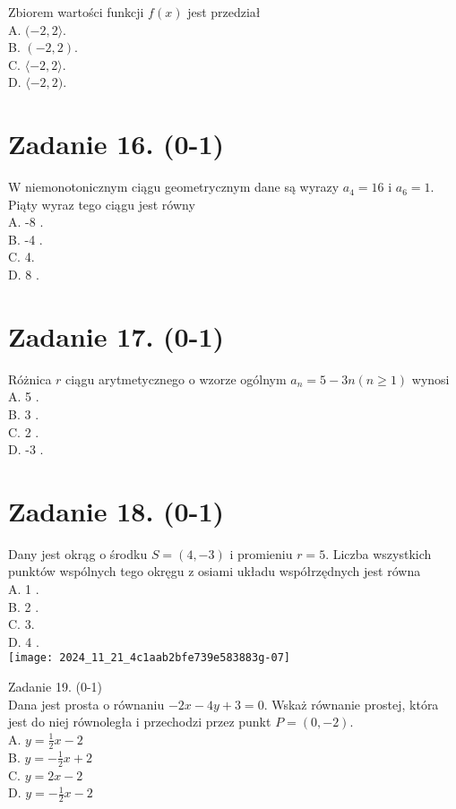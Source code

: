 \documentclass[10pt]{article}
\begin{document}
Zbiorem wartości funkcji \(f(x)\) jest przedział\\
A. \((-2,2\rangle\).\\
B. \((-2,2)\).\\
C. \(\langle-2,2\rangle\).\\
D. \(\langle-2,2)\).

\section*{Zadanie 16. (0-1)}
W niemonotonicznym ciągu geometrycznym dane są wyrazy \(a_{4}=16\) i \(a_{6}=1\). Piąty wyraz tego ciągu jest równy\\
A. -8 .\\
B. -4 .\\
C. 4.\\
D. 8 .

\section*{Zadanie 17. (0-1)}
Różnica \(r\) ciągu arytmetycznego o wzorze ogólnym \(a_{n}=5-3 n(n \geqslant 1)\) wynosi\\
A. 5 .\\
B. 3 .\\
C. 2 .\\
D. -3 .

\section*{Zadanie 18. (0-1)}
Dany jest okrąg o środku \(S=(4,-3)\) i promieniu \(r=5\). Liczba wszystkich punktów wspólnych tego okręgu z osiami układu współrzędnych jest równa\\
A. 1 .\\
B. 2 .\\
C. 3.\\
D. 4 .\\
\texttt{[image: 2024\_11\_21\_4c1aab2bfe739e583883g-07]}

Zadanie 19. (0-1)\\
Dana jest prosta o równaniu \(-2 x-4 y+3=0\). Wskaż równanie prostej, która jest do niej równoległa i przechodzi przez punkt \(P=(0,-2)\).\\
A. \(y=\frac{1}{2} x-2\)\\
B. \(y=-\frac{1}{2} x+2\)\\
C. \(y=2 x-2\)\\
D. \(y=-\frac{1}{2} x-2\)
\end{document}
